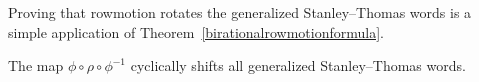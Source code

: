 \documentclass[ALCO,Unicode,published]{cedram}
\numberwithin{equation}{section}
\begin{document}








Proving that rowmotion rotates the generalized Stanley--Thomas words is a simple application of Theorem~\ref{birationalrowmotionformula}.

\begin{Th}
The map $\phi \circ \rho \circ \phi^{-1}$ cyclically shifts all generalized Stanley--Thomas words.
\end{Th}
\end{document}
